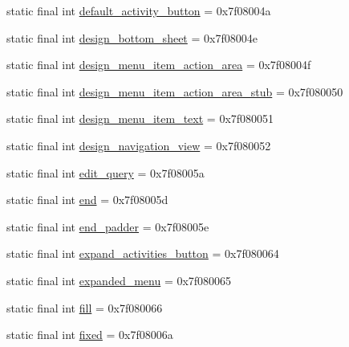 \begin{DoxyCompactItemize}
static final int \mbox{\hyperlink{classandroid_1_1support_1_1design_1_1R_1_1id_a1a434ee67ff2e4175b72e56f1a43d697}{default\+\_\+activity\+\_\+button}} = 0x7f08004a
\item 
static final int \mbox{\hyperlink{classandroid_1_1support_1_1design_1_1R_1_1id_aba38ef769e7a95935e5ae2f4fedea9d6}{design\+\_\+bottom\+\_\+sheet}} = 0x7f08004e
\item 
static final int \mbox{\hyperlink{classandroid_1_1support_1_1design_1_1R_1_1id_adb2647c3319106f9b429a3b5504f5ba5}{design\+\_\+menu\+\_\+item\+\_\+action\+\_\+area}} = 0x7f08004f
\item 
static final int \mbox{\hyperlink{classandroid_1_1support_1_1design_1_1R_1_1id_a8717eee55584a09abece563b626b9709}{design\+\_\+menu\+\_\+item\+\_\+action\+\_\+area\+\_\+stub}} = 0x7f080050
\item 
static final int \mbox{\hyperlink{classandroid_1_1support_1_1design_1_1R_1_1id_ab894ddc87ea19e63dea6cc1573857be7}{design\+\_\+menu\+\_\+item\+\_\+text}} = 0x7f080051
\item 
static final int \mbox{\hyperlink{classandroid_1_1support_1_1design_1_1R_1_1id_ad2aa9a71ea43bc8d7fdb4b1dee0c7528}{design\+\_\+navigation\+\_\+view}} = 0x7f080052
\item 
static final int \mbox{\hyperlink{classandroid_1_1support_1_1design_1_1R_1_1id_a925f3d0551eda6274ab628e9e89ef681}{edit\+\_\+query}} = 0x7f08005a
\item 
static final int \mbox{\hyperlink{classandroid_1_1support_1_1design_1_1R_1_1id_a7cc4a2356792688c15effb564af06f50}{end}} = 0x7f08005d
\item 
static final int \mbox{\hyperlink{classandroid_1_1support_1_1design_1_1R_1_1id_a9803747fe0a09faf24a2ea39622fffe9}{end\+\_\+padder}} = 0x7f08005e
\item 
static final int \mbox{\hyperlink{classandroid_1_1support_1_1design_1_1R_1_1id_a6c97cb6330a1bda8b2c1f142c7bb8938}{expand\+\_\+activities\+\_\+button}} = 0x7f080064
\item 
static final int \mbox{\hyperlink{classandroid_1_1support_1_1design_1_1R_1_1id_a5df7cf5b70c2db787dc229b79c1a7939}{expanded\+\_\+menu}} = 0x7f080065
\item 
static final int \mbox{\hyperlink{classandroid_1_1support_1_1design_1_1R_1_1id_a732bd99c00b6c445998253de74af48e5}{fill}} = 0x7f080066
\item 
static final int \mbox{\hyperlink{classandroid_1_1support_1_1design_1_1R_1_1id_a8c046e12f51095567fcff2b1f8df3f6b}{fixed}} = 0x7f08006a
\item 

\end{DoxyCompactItemize}
